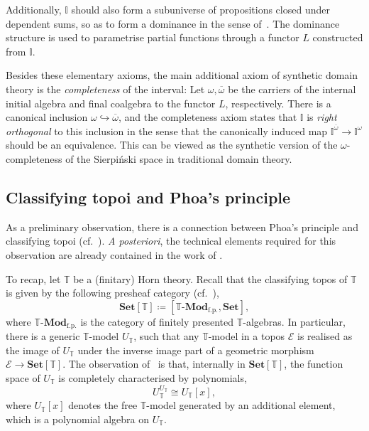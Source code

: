 \documentclass[a4paper,12pt]{amsart}
\theoremstyle{definition}
\newcommand{\mc}[1]{\mathcal{#1}}
\newcommand{\mb}[1]{\mathbf{#1}}
\newcommand{\mbb}[1]{\mathbb{#1}}
\newcommand{\T}{\mbb T}
\newcommand{\I}{\mbb I}
\newcommand{\mr}[1]{\mathrm{#1}}
\newcommand{\Set}{\mb{Set}}
\newcommand{\ov}[1]{\overline{#1}}
\newcommand{\hook}{\hookrightarrow}
\newcommand{\fp}{_{\mr{f.p.}}}
\newcommand{\mmod}[1]{#1\text{-}\mathbf{Mod}}
\begin{document}
Additionally, $\I$ should also form a subuniverse of propositions closed under dependent sums, so as to form a dominance in the sense of~\cite{rosolini1986continuity}. The dominance structure is used to parametrise partial functions through a functor $L$ constructed from $\I$. 

Besides these elementary axioms, the main additional axiom of synthetic domain theory is the \emph{completeness} of the interval: Let $\omega,\ov\omega$ be the carriers of the internal initial algebra and final coalgebra to the functor $L$, respectively. 
There is a canonical inclusion $\omega \hook \ov\omega$, and the completeness axiom states that $\I$ is \emph{right orthogonal} to this inclusion in the sense that the canonically induced map $\I^{\ov\omega} \to \I^{\omega}$ should be an equivalence. This can be viewed as the synthetic version of the $\omega$-completeness of the Sierpi\'nski space in traditional domain theory.

\subsection{Classifying topoi and Phoa's principle}\label{subsec:classtopphoa}

As a preliminary observation, there is a connection between Phoa's principle and classifying topoi (cf.~\cite[Lem 3.8]{gratzer2024directed}).
\emph{A posteriori}, the technical elements required for this observation are already contained in the work of \citet{RN879}.

To recap, let $\T$ be a (finitary) Horn theory. Recall that the classifying topos of $\T$ is given by the following presheaf category (cf.~\cite[D3.1]{johnstone2002sketches}),
\[ \Set[\T] \coloneq [\mmod\T\fp,\Set], \]
where $\mmod\T\fp$ is the category of finitely presented $\T$-algebras. In particular, there is a generic $\T$-model $U_\T$, such that any $\T$-model in a topos $\mc E$ is realised as the image of $U_\T$ under the inverse image part of a geometric morphism $\mc E \to \Set[\T]$. The observation of~\cite{RN879} is that, internally in $\Set[\T]$, the function space of $U_\T$ is completely characterised by polynomials,
\[ U_\T^{U_\T} \cong U_\T[x], \]
where $U_\T[x]$ denotes the free $\T$-model generated by an additional element, which is a  polynomial algebra on $U_\T$.
\end{document}
